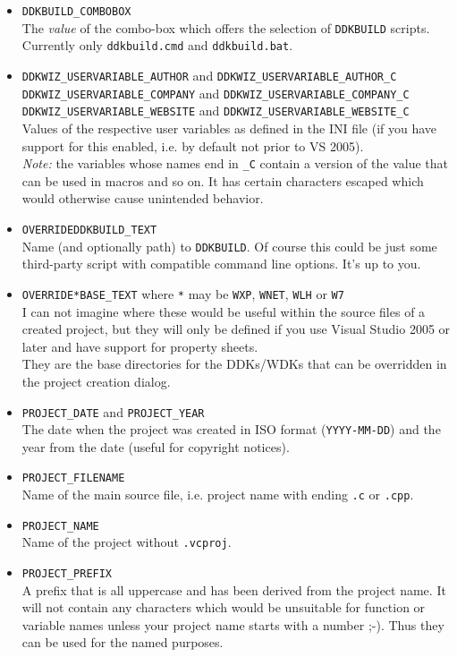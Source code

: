 \documentclass[a4paper,titlepage]{report}
\begin{document}
\begin{itemize}
  \item \verb+DDKBUILD_COMBOBOX+\\
        The \emph{value} of the combo-box which offers the selection of \texttt{DDKBUILD}
        scripts. Currently only \texttt{ddkbuild.cmd} and \texttt{ddkbuild.bat}.
  \item \verb+DDKWIZ_USERVARIABLE_AUTHOR+ and \verb+DDKWIZ_USERVARIABLE_AUTHOR_C+\\
        \verb+DDKWIZ_USERVARIABLE_COMPANY+ and \verb+DDKWIZ_USERVARIABLE_COMPANY_C+\\
        \verb+DDKWIZ_USERVARIABLE_WEBSITE+ and \verb+DDKWIZ_USERVARIABLE_WEBSITE_C+\\
        Values of the respective user variables as defined in the INI file (if
        you have support for this enabled, i.e. by default not prior to VS 2005).\\
        \emph{Note:} the variables whose names end in \verb+_C+ contain a version
        of the value that can be used in macros and so on. It has certain characters
        escaped which would otherwise cause unintended behavior.
  \item \verb+OVERRIDEDDKBUILD_TEXT+\\
        Name (and optionally path) to \texttt{DDKBUILD}. Of course this could be
        just some third-party script with compatible command line options. It's up
        to you.
  \item \verb+OVERRIDE*BASE_TEXT+ where \verb+*+ may be \verb+WXP+, \verb+WNET+, \verb+WLH+ or \verb+W7+\\
        I can not imagine where these would be useful within the source files of a
        created project, but they will only be defined if you use Visual Studio 2005
        or later and have support for property sheets.\\
        They are the base directories for the DDKs/WDKs that can be overridden in
        the project creation dialog.
  \item \verb+PROJECT_DATE+ and \verb+PROJECT_YEAR+\\
        The date when the project was created in ISO format (\texttt{YYYY-MM-DD})
        and the year from the date (useful for copyright notices).
  \item \verb+PROJECT_FILENAME+\\
        Name of the main source file, i.e. project name with ending \texttt{.c} or \texttt{.cpp}.
  \item \verb+PROJECT_NAME+\\
        Name of the project without \texttt{.vcproj}.
  \item \verb+PROJECT_PREFIX+\\
        A prefix that is all uppercase and has been derived from the project name.
        It will not contain any characters which would be unsuitable for function
        or variable names unless your project name starts with a number \textsf{;-)}.
        Thus they can be used for the named purposes.
\end{itemize}
\end{document}
